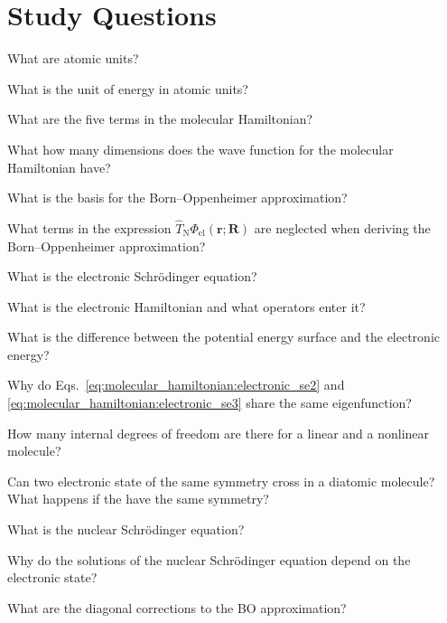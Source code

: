 \documentclass[../Main/chem532-notes.tex]{subfiles}
\begin{document}
\section*{Study Questions}
\begin{myenumerate}
\item What are atomic units?
\item What is the unit of energy in atomic units?
\item What are the five terms in the molecular Hamiltonian?
\item What how many dimensions does the wave function for the molecular Hamiltonian have?
\item What is the basis for the Born--Oppenheimer approximation?
\item What terms in the expression $\hat{T}_\mathrm{N}  \Phi_{\mathrm{el}}(\mathbf{r};\mathbf{R})$ are neglected when deriving the Born--Oppenheimer approximation?
\item What is the electronic Schr\"{o}dinger equation?
\item What is the electronic Hamiltonian and what operators enter it?
\item What is the difference between the potential energy surface and the electronic energy?
\item Why do Eqs.~\eqref{eq:molecular_hamiltonian:electronic_se2} and \eqref{eq:molecular_hamiltonian:electronic_se3} share the same eigenfunction?
\item How many internal degrees of freedom are there for a linear and a nonlinear molecule?
\item Can two electronic state of the same symmetry cross in a diatomic molecule? What happens if the have the same symmetry?
\item What is the nuclear Schr\"{o}dinger equation?
\item Why do the solutions of the nuclear Schr\"{o}dinger equation depend on the electronic state?
\item What are the diagonal corrections to the BO approximation?
\end{myenumerate}
\end{document}
